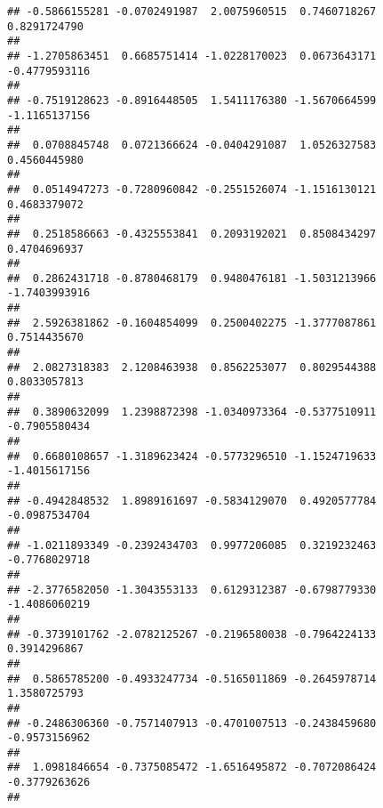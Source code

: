 \documentclass[]{article}
\begin{document}
\begin{verbatim}
## -0.5866155281 -0.0702491987  2.0075960515  0.7460718267  0.8291724790 
##                                                                       
## -1.2705863451  0.6685751414 -1.0228170023  0.0673643171 -0.4779593116 
##                                                                       
## -0.7519128623 -0.8916448505  1.5411176380 -1.5670664599 -1.1165137156 
##                                                                       
##  0.0708845748  0.0721366624 -0.0404291087  1.0526327583  0.4560445980 
##                                                                       
##  0.0514947273 -0.7280960842 -0.2551526074 -1.1516130121  0.4683379072 
##                                                                       
##  0.2518586663 -0.4325553841  0.2093192021  0.8508434297  0.4704696937 
##                                                                       
##  0.2862431718 -0.8780468179  0.9480476181 -1.5031213966 -1.7403993916 
##                                                                       
##  2.5926381862 -0.1604854099  0.2500402275 -1.3777087861  0.7514435670 
##                                                                       
##  2.0827318383  2.1208463938  0.8562253077  0.8029544388  0.8033057813 
##                                                                       
##  0.3890632099  1.2398872398 -1.0340973364 -0.5377510911 -0.7905580434 
##                                                                       
##  0.6680108657 -1.3189623424 -0.5773296510 -1.1524719633 -1.4015617156 
##                                                                       
## -0.4942848532  1.8989161697 -0.5834129070  0.4920577784 -0.0987534704 
##                                                                       
## -1.0211893349 -0.2392434703  0.9977206085  0.3219232463 -0.7768029718 
##                                                                       
## -2.3776582050 -1.3043553133  0.6129312387 -0.6798779330 -1.4086060219 
##                                                                       
## -0.3739101762 -2.0782125267 -0.2196580038 -0.7964224133  0.3914296867 
##                                                                       
##  0.5865785200 -0.4933247734 -0.5165011869 -0.2645978714  1.3580725793 
##                                                                       
## -0.2486306360 -0.7571407913 -0.4701007513 -0.2438459680 -0.9573156962 
##                                                                       
##  1.0981846654 -0.7375085472 -1.6516495872 -0.7072086424 -0.3779263626 
##                                                                       

\end{verbatim}
\end{document}
